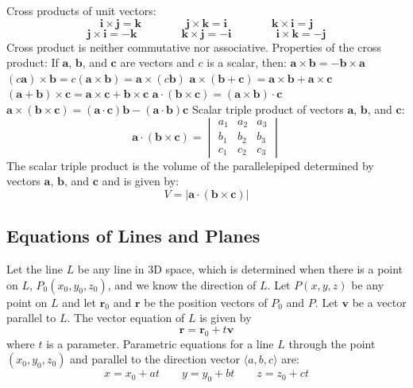 \documentclass{article}
\begin{document}
        \begin{outline}
        \1 Cross products of unit vectors: \[\mathbf{i\times j=k} \qquad \qquad \mathbf{j\times k=i} \qquad \qquad \mathbf{k\times i=j}\]\[\mathbf{j\times i=-k} \qquad \qquad \mathbf{k\times j=-i} \qquad \qquad \mathbf{i\times k=-j}\]
        \1 Cross product is neither commutative nor associative. 
        \1 Properties of the cross product: If \(\mathbf a\), \(\mathbf b\), and \(\mathbf c\) are vectors and \(c\) is a scalar, then: 
            \2 \(\mathbf{a\times b=-b\times a}\)
            \2 \((c\mathbf a)\times \mathbf b=c(\mathbf{a\times b})=\mathbf a\times(c\mathbf b)\)
            \2 \(\mathbf{a}\times(\mathbf{b+c})=\mathbf{a\times b+a\times c}\)
            \2 \((\mathbf{a+b})\times \mathbf c=\mathbf{a\times c+b\times c}\)
            \2 \(\mathbf{a\cdot(b\times c)}=\mathbf{(a\times b)\cdot c}\)
            \2 \(\mathbf{a\times(b\times c)}=\mathbf{(a\cdot c)b-(a\cdot b)c}\)
        \1 Scalar triple product of vectors \(\mathbf a\), \(\mathbf b\), and \(\mathbf c\): \[\mathbf{a\cdot(b\times c)}=\begin{vmatrix}
            a_1 & a_2 & a_3\\
            b_1 & b_2 & b_3 \\
            c_1 & c_2 & c_3
        \end{vmatrix}\]
        \1 The scalar triple product is the volume of the parallelepiped determined by vectors \(\mathbf a\), \(\mathbf b\), and \(\mathbf c\) and is given by: \[V=|\mathbf{a\cdot(b\times c)}|\]

    \end{outline}
    \begin{multicols}{2}
    \subsection{Equations of Lines and Planes}
    \begin{outline}
        \1 Let the line $L$ be any line in 3D space, which is determined when there is a point on $L$, \(P_0(x_0,y_0,z_0)\), and we know the direction of $L$. Let \(P(x,y,z)\) be any point on $L$ and let \(\mathbf r_0\) and \(\mathbf r\) be the position vectors of \(P_0\) and \(P\). Let \(\mathbf v\) be a vector parallel to $L$. The vector equation of $L$ is given by \[\mathbf r=\mathbf r_0+t\mathbf v\] where $t$ is a parameter. 
        \1 Parametric equations for a line $L$ through the point \((x_0,y_0,z_0)\) and parallel to the direction vector \(\langle a,b,c\rangle\) are: \[x=x_0+at\qquad y=y_0+bt\qquad z=z_0+ct\]
    \end{outline}\end{multicols}
\end{document}
